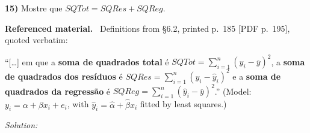 \documentclass[11pt,a4paper]{article}
\newif\ifsolucoes
\newcommand{\espacoresol}{4.5cm}   %
\numberwithin{equation}{questao}   %
\newenvironment{refmat}{\par\smallskip\noindent\small\textbf{Referenced material.}\ }{\par\smallskip}
\newcommand{\resolespaco}{\ifsolucoes\else\par\textit{Solution:}\vspace{\espacoresol}\par\fi}
\begin{document}
\begin{otherlanguage}{brazil}
\textbf{15)} Mostre que $SQTot=SQRes+SQReg$.
\end{otherlanguage}
\begin{refmat}
Definitions from §6.2, printed p.~185 [PDF p.~195], quoted verbatim:
\begin{otherlanguage}{brazil}
``[\dots] em que a \textbf{soma de quadrados total} é
$SQTot=\sum_{i=1}^n(y_i-\overline y)^2$, a \textbf{soma de quadrados dos resíduos} é
$SQRes=\sum_{i=1}^n(y_i-\widehat y_i)^2$ e a \textbf{soma de quadrados da regressão} é
$SQReg=\sum_{i=1}^n(\widehat y_i-\overline y)^2$.'' (Model: $y_i=\alpha+\beta x_i+e_i$, with
$\widehat y_i=\widehat\alpha+\widehat\beta x_i$ fitted by least squares.)
\end{otherlanguage}
\end{refmat}
\resolespaco
\end{document}
